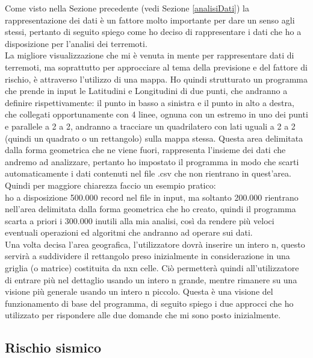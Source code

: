 Come visto nella Sezione precedente (vedi Sezione \ref{analisiDati}) la rappresentazione dei dati \`e un fattore molto importante per dare un senso agli stessi, pertanto di seguito spiego come ho deciso di rappresentare i dati che ho a disposizione per l'analisi dei terremoti.\\
La migliore visualizzazione che mi \`e venuta in mente per rappresentare dati di terremoti, ma soprattutto per approcciare al tema della previsione e del fattore di rischio, \`e attraverso l'utilizzo di una mappa. Ho quindi strutturato un programma che prende in input le Latitudini e Longitudini di due punti, che andranno a definire rispettivamente: il punto in basso a sinistra e il punto in alto a destra, che collegati opportunamente con 4 linee, ognuna con un estremo in uno dei punti e parallele a 2 a 2, andranno a tracciare un quadrilatero con lati uguali a 2 a 2 (quindi un quadrato o un rettangolo) sulla mappa stessa. Questa area delimitata dalla forma geometrica che ne viene fuori, rappresenta l'insieme dei dati che andremo ad analizzare, pertanto ho impostato il programma in modo che scarti automaticamente i dati contenuti nel file .csv che non rientrano in quest'area. Quindi per maggiore chiarezza faccio un esempio pratico:\\ ho a disposizione 500.000 record nel file in input, ma soltanto 200.000 rientrano nell'area delimitata dalla forma geometrica che ho creato, quindi il programma scarta a priori i 300.000 inutili alla mia analisi, cos\`i da rendere pi\`u veloci eventuali operazioni ed algoritmi che andranno ad operare sui dati.\\
Una volta decisa l'area geografica, l'utilizzatore dovr\`a inserire un intero n, questo servir\`a a suddividere il rettangolo preso inizialmente in considerazione in una griglia (o matrice) costituita da nxn celle. Ci\`o permetter\`a quindi all'utilizzatore di entrare pi\`u nel dettaglio usando un intero n grande, mentre rimanere su una visione pi\`u generale usando un intero n piccolo. Questa \`e una visione del funzionamento di base del programma, di seguito spiego i due approcci che ho utilizzato per rispondere alle due domande che mi sono posto inizialmente.

\subsection{Rischio sismico}\label{rischioSismico}

